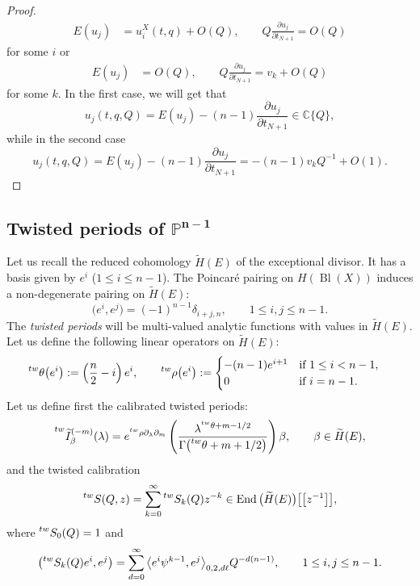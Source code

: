 \documentclass[pdftex]{sigma}
\numberwithin{equation}{section}
\newcommand{\leftexp}[2]{{\vphantom{#2}}^{#1}{#2}}
\newcommand{\CC}{\mathbb{C}}
\newcommand{\PP}{\mathbb{P}}
\begin{document}
\begin{proof}
\begin{align*}
E(u_j) & = u_i^X(t,q) + O(Q), \qquad
Q\frac{\partial u_j}{\partial t_{N+1}} = O(Q)
\end{align*}
for some $i$ or
\begin{align*}
E(u_j) & = O(Q),\qquad
Q\frac{\partial u_j}{\partial t_{N+1}}= v_k+ O(Q)
\end{align*}
for some $k$. In the first case, we will get that
\[
u_j(t,q,Q)= E(u_j)-(n-1) \frac{\partial u_j}{\partial t_{N+1}} \in \CC\{Q\},
\]
while in the second case
\[
u_j(t,q,Q)= E(u_j)-(n-1) \frac{\partial u_j}{\partial t_{N+1}}= -(n-1) v_k Q^{-1} + O(1).\tag*{\qed}
\] \renewcommand{\qed}{}
\end{proof}

\subsection[Twisted periods of P\^\{n-1\}]{Twisted periods of $\boldsymbol{\PP^{n-1}}$}
\label{sec:tw_periods}
Let us recall the reduced cohomology $\widetilde{H}(E)$ of the
exceptional divisor. It has a basis given by $e^i$ ($1\leq i\leq
n-1$). The Poincar\'e pairing on $H(\operatorname{Bl}(X))$ induces a non-degenerate pairing on $\widetilde{H}(E)$:
\[
\big(e^i,e^j\big) = (-1)^{n-1} \delta_{i+j,n},\qquad 1\leq i,j\leq n-1.
\]
The {\em twisted periods} will be multi-valued analytic functions with values in $\widetilde{H}(E)$.
Let us define the following linear operators on $\widetilde{H}(E)$:
\begin{align*}
\leftexp{tw}{\theta} \big(e^i\big) & := \left(\frac{n}{2} -i\right) e^i,\qquad
\leftexp{tw}{\rho} \big(e^i\big) :=
 \begin{cases}
 -(n-1) e^{i+1} & \mbox{if } 1\leq i<n-1, \\
 0 & \mbox{if } i=n-1.
 \end{cases}
\end{align*}
Let us define first the calibrated twisted periods:
\[
\leftexp{ tw}{\widetilde{I}}^{(-m)}_\beta(\lambda) =
e^{\leftexp{ tw}{\rho} \partial_\lambda \partial_m}
\left(
 \frac{
 \lambda^{ \leftexp{tw}{\theta}+m-1/2}}{
 \Gamma\big(\leftexp{tw}{\theta}+m+1/2\big)}
 \right)
 \beta,\qquad \beta\in \widetilde{H}(E),
\]
 and the twisted calibration
 \[
 \leftexp{tw}{S}(Q,z) =
\sum_{k=0}^\infty
\leftexp{tw}{S}_k(Q) z^{-k}
 \in \operatorname{End}\big(\widetilde{H}(E)\big)\big[\big[z^{-1}\big]\big],
 \]
 where $\leftexp{ tw}{S}_0(Q)=1$ and
 \[
 \big(\leftexp{tw}{S}_k(Q) e^i,e^j\big) =
 \sum_{d=0}^\infty
 \big\langle e^i\psi^{k-1},e^j\big\rangle_{0,2,d\ell} Q^{-d(n-1)},\qquad
 1\leq i,j\leq n-1.
 \]
\end{document}
